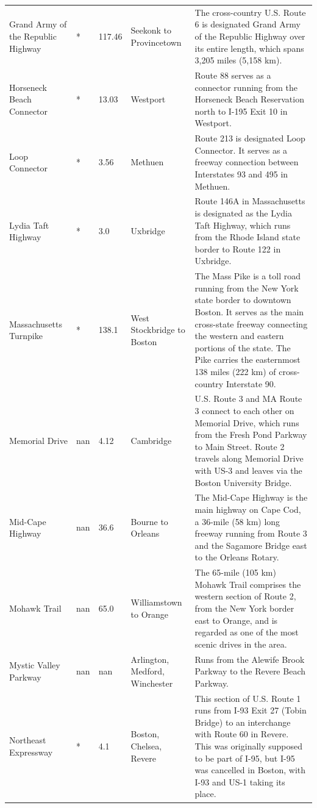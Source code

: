 \documentclass{article}
\begin{document}
\begin{tabular}{lllll}
Grand Army of the Republic Highway & * & 117.46 & Seekonk to Provincetown & The cross-country U.S. Route 6 is designated Grand Army of the Republic Highway over its entire length, which spans 3,205 miles (5,158 km). \\
Horseneck Beach Connector & * & 13.03 & Westport & Route 88 serves as a connector running from the Horseneck Beach Reservation north to I-195 Exit 10 in Westport. \\
Loop Connector & * & 3.56 & Methuen & Route 213 is designated Loop Connector. It serves as a freeway connection between Interstates 93 and 495 in Methuen. \\
Lydia Taft Highway & * & 3.0 & Uxbridge & Route 146A in Massachusetts is designated as the Lydia Taft Highway, which runs from the Rhode Island state border to Route 122 in Uxbridge. \\
Massachusetts Turnpike & * & 138.1 & West Stockbridge to Boston & The Mass Pike is a toll road running from the New York state border to downtown Boston. It serves as the main cross-state freeway connecting the western and eastern portions of the state. The Pike carries the easternmost 138 miles (222 km) of cross-country Interstate 90. \\
Memorial Drive & nan & 4.12 & Cambridge & U.S. Route 3 and MA Route 3 connect to each other on Memorial Drive, which runs from the Fresh Pond Parkway to Main Street. Route 2 travels along Memorial Drive with US-3 and leaves via the Boston University Bridge. \\
Mid-Cape Highway & nan & 36.6 & Bourne to Orleans & The Mid-Cape Highway is the main highway on Cape Cod, a 36-mile (58 km) long freeway running from Route 3 and the Sagamore Bridge east to the Orleans Rotary. \\
Mohawk Trail & nan & 65.0 & Williamstown to Orange & The 65-mile (105 km) Mohawk Trail comprises the western section of Route 2, from the New York border east to Orange, and is regarded as one of the most scenic drives in the area. \\
Mystic Valley Parkway & nan & nan & Arlington, Medford, Winchester & Runs from the Alewife Brook Parkway to the Revere Beach Parkway. \\
Northeast Expressway & * & 4.1 & Boston, Chelsea, Revere & This section of U.S. Route 1 runs from I-93 Exit 27 (Tobin Bridge) to an interchange with Route 60 in Revere. This was originally supposed to be part of I-95, but I-95 was cancelled in Boston, with I-93 and US-1 taking its place. \\

\end{tabular}
\end{document}
